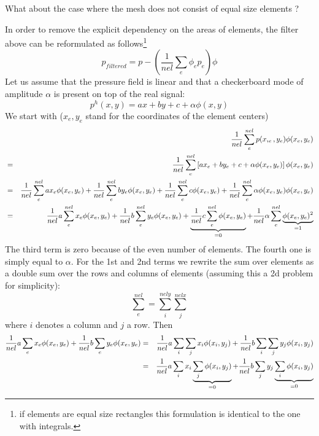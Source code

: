 What about the case where the mesh does not consist of equal size elements ?

In order to remove the explicit dependency on the areas of elements, 
the filter above can be reformulated as follows\footnote{if elements are 
equal size rectangles this formulation is identical to the one with integrals.}
\[
\boxed{
p_{filtered} = p - \left( \frac{1}{nel} \sum_e  \phi_e p_e \right) \phi
}
\]
Let us assume that the pressure field is linear and that a checkerboard mode 
of amplitude $\alpha$ is present on top of the real signal:
\[
p^h(x,y)=ax+by+c + \alpha \phi(x,y)
\]
We start with ($x_e,y_e$ stand for the coordinates of the element centers)
\begin{eqnarray}
&&\frac{1}{nel} \sum_e^{nel} p(x,_e,y_e) \phi(x_e,y_e) \nonumber\\
&=& \frac{1}{nel} \sum_e^{nel} \left[ ax_e+by_e+c + \alpha \phi(x_e,y_e)  \right] \phi(x_e,y_e) \nonumber\\
&=& \frac{1}{nel} \sum_e^{nel}  a x_e \phi(x_e,y_e) 
+ \frac{1}{nel} \sum_e^{nel} by_e  \phi(x_e,y_e) 
+ \frac{1}{nel} \sum_e^{nel} c  \phi(x_e,y_e) 
+ \frac{1}{nel} \sum_e^{nel} \alpha \phi(x_e,y_e)   \phi(x_e,y_e) \nonumber\\
&=& \frac{1}{nel} a \sum_e^{nel}   x_e \phi(x_e,y_e) 
+ \frac{1}{nel} b\sum_e^{nel} y_e  \phi(x_e,y_e) 
+ \underbrace{\frac{1}{nel} c\sum_e^{nel}   \phi(x_e,y_e) }_{=0}
+ \frac{1}{nel} \alpha \sum_e^{nel}  \underbrace{\phi(x_e,y_e)^2}_{=1} 
\end{eqnarray}
The third term is zero because of the even number of elements. 
The fourth one is simply equal to $\alpha$.
For the 1st and 2nd terms we rewrite the sum over elements as a double sum over the rows and 
columns of elements (assuming this a 2d problem for simplicity):
\[
\sum_e^{nel} = \sum_i^{nely} \sum_j^{nelx}
\]
where $i$ denotes a column and $j$ a row. Then 
\begin{eqnarray}
\frac{1}{nel} a \sum_e   x_e \phi(x_e,y_e)  + \frac{1}{nel} b\sum_e y_e  \phi(x_e,y_e) 
&=&\frac{1}{nel} a \sum_i\sum_j   x_i \phi(x_i,y_j)  + \frac{1}{nel} b \sum_i\sum_j y_j  \phi(x_i,y_j) \nonumber\\
&=&\frac{1}{nel} a \sum_i   x_i  \underbrace{\sum_j\phi(x_i,y_j)}_{=0}  
+ \frac{1}{nel} b \sum_j y_j  \underbrace{\sum_i\phi(x_i,y_j) }_{=0}\nonumber
\end{eqnarray}
